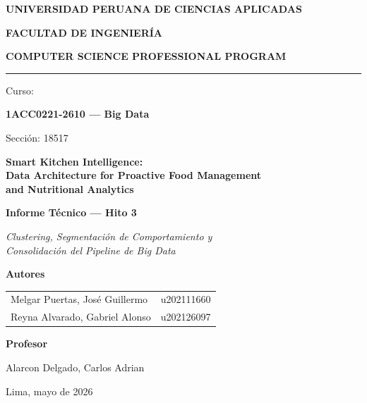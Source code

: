 \documentclass[12pt,a4paper]{article}
\begin{document}
\begin{titlepage}
\centering
\vspace*{0.5cm}

{\LARGE\bfseries UNIVERSIDAD PERUANA DE CIENCIAS APLICADAS\par}
\vspace{0.3cm}
{\Large\bfseries FACULTAD DE INGENIERÍA\par}
\vspace{0.2cm}
{\large\bfseries COMPUTER SCIENCE PROFESSIONAL PROGRAM\par}

\vspace{1.2cm}
{\color{upcred}\rule{6cm}{3pt}}\par
\vspace{0.8cm}

{\large Curso:\par}
{\Large\bfseries 1ACC0221-2610 — Big Data\par}
{\large Sección: 18517\par}

\vspace{1.5cm}
\begin{minipage}{0.85\textwidth}
\centering
{\Large\bfseries Smart Kitchen Intelligence: \\[0.3em]
Data Architecture for Proactive Food Management\\[0.3em]
and Nutritional Analytics\par}
\end{minipage}

\vspace{1.5cm}
{\large\bfseries Informe Técnico — Hito 3\par}
{\large\itshape Clustering, Segmentación de Comportamiento y\\
Consolidación del Pipeline de Big Data\par}

\vspace{1.8cm}
{\large\bfseries Autores\par}
\vspace{0.4cm}
\begin{tabular}{ll}
Melgar Puertas, José Guillermo & u202111660 \\[4pt]
Reyna Alvarado, Gabriel Alonso & u202126097 \\
\end{tabular}

\vspace{1.2cm}
{\large\bfseries Profesor\par}
\vspace{0.3cm}
{\large Alarcon Delgado, Carlos Adrian\par}

\vfill
{\large Lima, mayo de 2026\par}
\end{titlepage}
\end{document}
